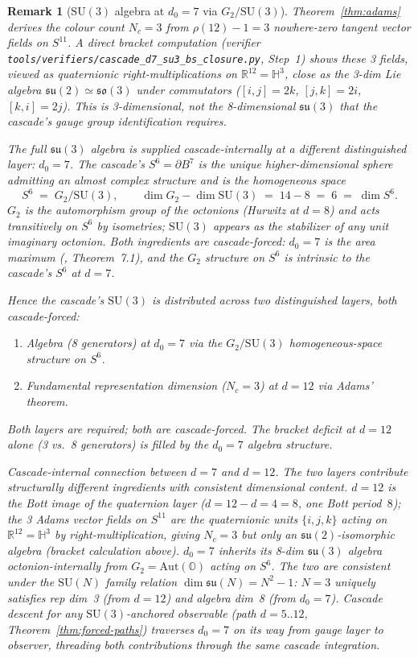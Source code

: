 \documentclass[12pt,a4paper]{article}
\newtheorem{remark}[theorem]{Remark}
\begin{document}
\begin{remark}[$\mathrm{SU}(3)$ algebra at $d_0=7$ via $G_2/\mathrm{SU}(3)$]\label{rem:su3-d7-algebra}
Theorem~\ref{thm:adams} derives the colour count $N_c=3$ from
$\rho(12)-1=3$ nowhere-zero tangent vector fields on $S^{11}$. A
direct bracket computation (verifier
\texttt{tools/\allowbreak verifiers/\allowbreak cascade\_d7\_su3\_bs\_closure.py}, Step~1)
shows these 3 fields, viewed as quaternionic right-multiplications
on $\mathbb{R}^{12}=\mathbb{H}^3$, close as the 3-dim Lie algebra
$\mathfrak{su}(2)\simeq\mathfrak{so}(3)$ under commutators
($[i,j]=2k$, $[j,k]=2i$, $[k,i]=2j$). This is 3-dimensional, not
the 8-dimensional $\mathfrak{su}(3)$ that the cascade's gauge group
identification requires.

The full $\mathfrak{su}(3)$ algebra is supplied cascade-internally
at a different distinguished layer: $d_0=7$. The cascade's
$S^6=\partial B^7$ is the unique higher-dimensional sphere
admitting an almost complex structure and is the homogeneous space
\[
S^6 \;=\; G_2/\mathrm{SU}(3),
\qquad \dim G_2 - \dim\mathrm{SU}(3) \;=\; 14-8 \;=\; 6 \;=\; \dim S^6.
\]
$G_2$ is the automorphism group of the octonions (Hurwitz at
$d=8$) and acts transitively on $S^6$ by isometries; $\mathrm{SU}(3)$
appears as the stabilizer of any unit imaginary octonion. Both
ingredients are cascade-forced: $d_0=7$ is the area maximum
(\cite{part0}, Theorem~7.1), and the
$G_2$ structure on $S^6$ is intrinsic to the cascade's $S^6$ at $d=7$.

Hence the cascade's $\mathrm{SU}(3)$ is distributed across two
distinguished layers, both cascade-forced:
\begin{enumerate}
\item \emph{Algebra} (8 generators) at $d_0=7$ via the $G_2/\mathrm{SU}(3)$
  homogeneous-space structure on $S^6$.
\item \emph{Fundamental representation dimension} ($N_c=3$) at $d=12$
  via Adams' theorem.
\end{enumerate}
Both layers are required; both are cascade-forced. The bracket
deficit at $d=12$ alone (3 vs.\ 8 generators) is filled by the
$d_0=7$ algebra structure.

\emph{Cascade-internal connection between $d=7$ and $d=12$.}  The two
layers contribute structurally different ingredients with consistent
dimensional content.  $d=12$ is the Bott image of the quaternion
layer ($d=12 - d=4 = 8$, one Bott period~$8$); the 3 Adams vector
fields on $S^{11}$ are the quaternionic units $\{i, j, k\}$ acting
on $\mathbb{R}^{12}=\mathbb{H}^3$ by right-multiplication, giving
$N_c=3$ but only an $\mathfrak{su}(2)$-isomorphic algebra (bracket
calculation above).  $d_0=7$ inherits its 8-dim
$\mathfrak{su}(3)$ algebra octonion-internally from $G_2 =
\mathrm{Aut}(\mathbb{O})$ acting on $S^6$.  The two are consistent
under the $\mathrm{SU}(N)$ family relation
$\dim\mathfrak{su}(N) = N^2-1$: $N=3$ uniquely satisfies rep dim~3
(from $d=12$) and algebra dim~8 (from $d_0=7$).
Cascade descent for any $\mathrm{SU}(3)$-anchored observable
(path $d=5..12$, Theorem~\ref{thm:forced-paths}) traverses $d_0=7$
on its way from gauge layer to observer, threading both
contributions through the same cascade integration.


\end{remark}
\end{document}
